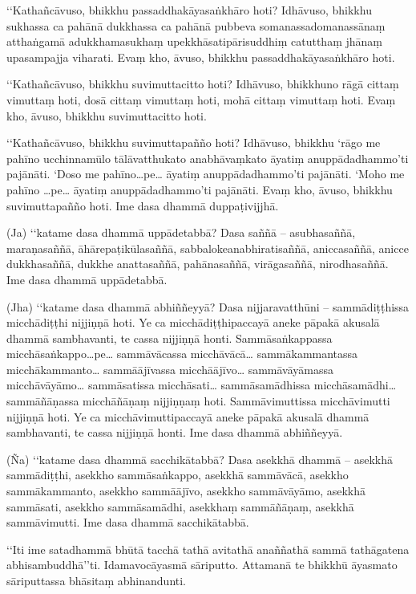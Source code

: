 ‘‘Kathañcāvuso, bhikkhu passaddhakāyasaṅkhāro hoti? Idhāvuso, bhikkhu sukhassa ca pahānā dukkhassa ca pahānā pubbeva somanassadomanassānaṃ atthaṅgamā adukkhamasukhaṃ upekkhāsatipārisuddhiṃ catutthaṃ jhānaṃ upasampajja viharati. Evaṃ kho, āvuso, bhikkhu passaddhakāyasaṅkhāro hoti.

‘‘Kathañcāvuso, bhikkhu suvimuttacitto hoti? Idhāvuso, bhikkhuno rāgā cittaṃ vimuttaṃ hoti, dosā cittaṃ vimuttaṃ hoti, mohā cittaṃ vimuttaṃ hoti. Evaṃ kho, āvuso, bhikkhu suvimuttacitto hoti.

‘‘Kathañcāvuso, bhikkhu suvimuttapañño hoti? Idhāvuso, bhikkhu ‘rāgo me pahīno ucchinnamūlo tālāvatthukato anabhāvaṃkato āyatiṃ anuppādadhammo’ti pajānāti. ‘Doso me pahīno…pe… āyatiṃ anuppādadhammo’ti pajānāti. ‘Moho me pahīno …pe… āyatiṃ anuppādadhammo’ti pajānāti. Evaṃ kho, āvuso, bhikkhu suvimuttapañño hoti. Ime dasa dhammā duppaṭivijjhā.

(Ja) ‘‘katame dasa dhammā uppādetabbā? Dasa saññā – asubhasaññā, maraṇasaññā, āhārepaṭikūlasaññā, sabbalokeanabhiratisaññā, aniccasaññā, anicce dukkhasaññā, dukkhe anattasaññā, pahānasaññā, virāgasaññā, nirodhasaññā. Ime dasa dhammā uppādetabbā.

(Jha) ‘‘katame dasa dhammā abhiññeyyā? Dasa nijjaravatthūni – sammādiṭṭhissa micchādiṭṭhi nijjiṇṇā hoti. Ye ca micchādiṭṭhipaccayā aneke pāpakā akusalā dhammā sambhavanti, te cassa nijjiṇṇā honti. Sammāsaṅkappassa micchāsaṅkappo…pe… sammāvācassa micchāvācā… sammākammantassa micchākammanto… sammāājīvassa micchāājīvo… sammāvāyāmassa micchāvāyāmo… sammāsatissa micchāsati… sammāsamādhissa micchāsamādhi… sammāñāṇassa micchāñāṇaṃ nijjiṇṇaṃ hoti. Sammāvimuttissa micchāvimutti nijjiṇṇā hoti. Ye ca micchāvimuttipaccayā aneke pāpakā akusalā dhammā sambhavanti, te cassa nijjiṇṇā honti. Ime dasa dhammā abhiññeyyā.

(Ña) ‘‘katame dasa dhammā sacchikātabbā? Dasa asekkhā dhammā – asekkhā sammādiṭṭhi, asekkho sammāsaṅkappo, asekkhā sammāvācā, asekkho sammākammanto, asekkho sammāājīvo, asekkho sammāvāyāmo, asekkhā sammāsati, asekkho sammāsamādhi, asekkhaṃ sammāñāṇaṃ, asekkhā sammāvimutti. Ime dasa dhammā sacchikātabbā.

‘‘Iti ime satadhammā bhūtā tacchā tathā avitathā anaññathā sammā tathāgatena abhisambuddhā’’ti. Idamavocāyasmā sāriputto. Attamanā te bhikkhū āyasmato sāriputtassa bhāsitaṃ abhinandunti.


